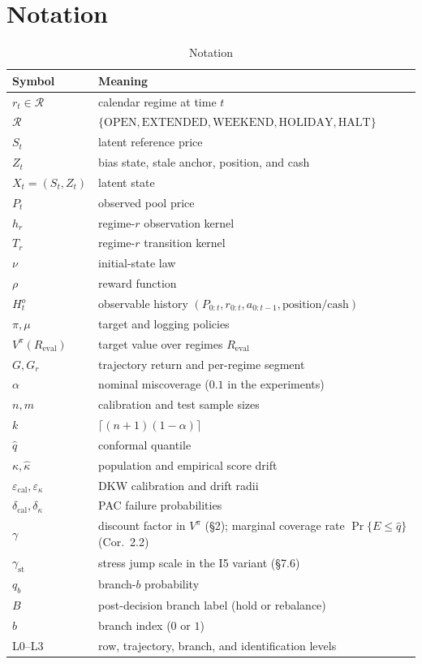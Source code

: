 
\section{Notation}\label{app:d}

\begin{table}[H]
\caption*{Notation}
\centering
\small
\begin{tabular}{@{}ll@{}}
\toprule
Symbol & Meaning \\
\midrule
$r_t\in\mathcal R$ & calendar regime at time $t$ \\
$\mathcal R$ & $\{\mathrm{OPEN},\mathrm{EXTENDED},\mathrm{WEEKEND},\mathrm{HOLIDAY},\mathrm{HALT}\}$ \\
$S_t$ & latent reference price \\
$Z_t$ & bias state, stale anchor, position, and cash \\
$X_t=(S_t,Z_t)$ & latent state \\
$P_t$ & observed pool price \\
$h_r$ & regime-$r$ observation kernel \\
$T_r$ & regime-$r$ transition kernel \\
$\nu$ & initial-state law \\
$\rho$ & reward function \\
$H_t^o$ & observable history $(P_{0:t},r_{0:t},a_{0:t-1},\text{position/cash})$ \\
$\pi,\mu$ & target and logging policies \\
$V^\pi(R_{\mathrm{eval}})$ & target value over regimes $R_{\mathrm{eval}}$ \\
$G,G_r$ & trajectory return and per-regime segment \\
$\alpha$ & nominal miscoverage ($0.1$ in the experiments) \\
$n,m$ & calibration and test sample sizes \\
$k$ & $\lceil(n+1)(1-\alpha)\rceil$ \\
$\hat q$ & conformal quantile \\
$\kappa,\hat\kappa$ & population and empirical score drift \\
$\varepsilon_{\mathrm{cal}},\varepsilon_\kappa$ & DKW calibration and drift radii \\
$\delta_{\mathrm{cal}},\delta_\kappa$ & PAC failure probabilities \\
$\gamma$ & discount factor in $V^\pi$ (\S2); marginal coverage rate $\Pr\{E\le\hat q\}$ (Cor.~2.2) \\
$\gamma_{\mathrm{st}}$ & stress jump scale in the I5 variant (\S7.6) \\
$q_b$ & branch-$b$ probability \\
$B$ & post-decision branch label (hold or rebalance) \\
$b$ & branch index ($0$ or $1$) \\
L0--L3 & row, trajectory, branch, and identification levels \\
\bottomrule
\end{tabular}
\end{table}
